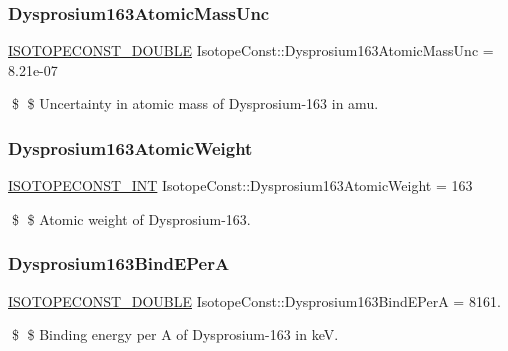 \subsubsection{\texorpdfstring{Dysprosium163\+Atomic\+Mass\+Unc}{Dysprosium163AtomicMassUnc}}
{\footnotesize\ttfamily \mbox{\hyperlink{group___isotope_const-_macros_ga8f45a7272ce02c0b4c65c44636ed719a}{I\+S\+O\+T\+O\+P\+E\+C\+O\+N\+S\+T\+\_\+\+D\+O\+U\+B\+LE}} Isotope\+Const\+::\+Dysprosium163\+Atomic\+Mass\+Unc = 8.\+21e-\/07}

\$ \$ Uncertainty in atomic mass of Dysprosium-\/163 in amu. \mbox{\label{group___isotope_const-_dysprosium-_dy163_ga9164de59e6faafad674cd11a22b74e63}} 
\subsubsection{\texorpdfstring{Dysprosium163\+Atomic\+Weight}{Dysprosium163AtomicWeight}}
{\footnotesize\ttfamily \mbox{\hyperlink{group___isotope_const-_macros_ga5f18360b3e99483a35c32d789e62621c}{I\+S\+O\+T\+O\+P\+E\+C\+O\+N\+S\+T\+\_\+\+I\+NT}} Isotope\+Const\+::\+Dysprosium163\+Atomic\+Weight = 163}

\$ \$ Atomic weight of Dysprosium-\/163. \mbox{\label{group___isotope_const-_dysprosium-_dy163_ga4a0689f8d0c6bb6cd93837a7293d6f70}} 
\subsubsection{\texorpdfstring{Dysprosium163\+Bind\+E\+PerA}{Dysprosium163BindEPerA}}
{\footnotesize\ttfamily \mbox{\hyperlink{group___isotope_const-_macros_ga8f45a7272ce02c0b4c65c44636ed719a}{I\+S\+O\+T\+O\+P\+E\+C\+O\+N\+S\+T\+\_\+\+D\+O\+U\+B\+LE}} Isotope\+Const\+::\+Dysprosium163\+Bind\+E\+PerA = 8161.}

\$ \$ Binding energy per A of Dysprosium-\/163 in keV. \mbox{\label{group___isotope_const-_dysprosium-_dy163_ga666dbdbd0c57ba03763d79313200a3c4}} 
